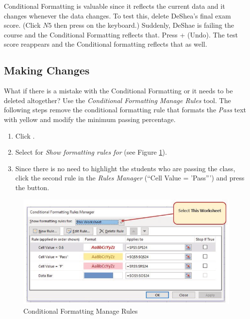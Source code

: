 Conditional Formatting is valuable since it reflects the current data and it changes whenever the data changes. To test this, delete DeShea's final exam score. (Click $ N5 $ then press  on the keyboard.) Suddenly, DeShae is failing the course and the Conditional Formatting reflects that. Press  +  (Undo). The test score reappears and the Conditional formatting reflects that as well.

\subsection{Making Changes}

What if there is a mistake with the Conditional Formatting or it needs to be deleted altogether? Use the \textit{Conditional Formatting Manage Rules} tool. The following steps remove the conditional formatting rule that formats the \textit{Pass} text with yellow and modify the minimum passing percentage.

\begin{enumerate}
	\item Click . 
	\item Select  for \textit{Show formatting rules for} (see Figure \ref{03:fig23}).
	\item Since there is no need to highlight the students who are passing the class, click the second rule in the \textit{Rules Manager} (``Cell Value = 'Pass''') and press the  button.
\end{enumerate}

\begin{figure}[H]
	\centering
	\includegraphics[width=\maxwidth{.95\linewidth}]{gfx/ch03_fig23}
	\caption{Conditional Formatting Manage Rules}
	\label{03:fig23}
\end{figure}

